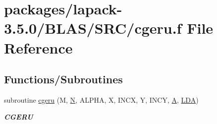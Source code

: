 \hypertarget{lapack-3_85_80_2BLAS_2SRC_2cgeru_8f}{}\section{packages/lapack-\/3.5.0/\+B\+L\+A\+S/\+S\+R\+C/cgeru.f File Reference}
\label{lapack-3_85_80_2BLAS_2SRC_2cgeru_8f}
\subsection*{Functions/\+Subroutines}
\begin{DoxyCompactItemize}
\item 
subroutine \hyperlink{group__complex__blas__level2_gab21c402efadfa2023cfbc06911506e42}{cgeru} (M, \hyperlink{polmisc_8c_a0240ac851181b84ac374872dc5434ee4}{N}, A\+L\+P\+H\+A, X, I\+N\+C\+X, Y, I\+N\+C\+Y, \hyperlink{classA}{A}, \hyperlink{example__user_8c_ae946da542ce0db94dced19b2ecefd1aa}{L\+D\+A})
\begin{DoxyCompactList}\small\item\em {\bfseries C\+G\+E\+R\+U} \end{DoxyCompactList}\end{DoxyCompactItemize}
